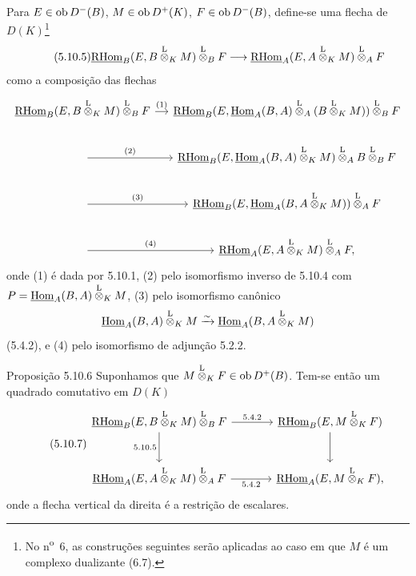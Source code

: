 Para $E\in\operatorname{ob} D^-(B)$, $M\in\operatorname{ob} D^+(K)$, $F\in\operatorname{ob} D^-(B)$, define-se uma flecha de $D(K)$\footnote{No n\textsuperscript{o}~6, as construções seguintes serão aplicadas ao caso em que $M$ é um complexo dualizante (6.7).}
\begin{equation}\tag{5.10.5}
\underline{\mathrm{RHom}}_B(E,B\overset{\mathrm L}{\otimes}_KM)\overset{\mathrm L}{\otimes}_BF\longrightarrow\underline{\mathrm{RHom}}_A(E,A\overset{\mathrm L}{\otimes}_KM)\overset{\mathrm L}{\otimes}_AF
\end{equation}
como a composição das flechas
\[
\begin{tikzcd}[column sep=small]
\uRHom_B(E,B\lten_KM)\lten_BF \arrow[r,"(1)"] & \uRHom_B(E,\uHom_A(B,A)\lten_A(B\lten_KM))\lten_BF \\
\arrow[r,"(2)"] & \uRHom_B(E,\uHom_A(B,A)\lten_KM)\lten_A B\lten_BF \\
\arrow[r,"(3)"] & \uRHom_B(E,\uHom_A(B,A\lten_KM))\lten_AF \\
\arrow[r,"(4)"] & \uRHom_A(E,A\lten_KM)\lten_AF,
\end{tikzcd}
\]
onde (1) é dada por 5.10.1, (2) pelo isomorfismo inverso de 5.10.4 com $P=\underline{\operatorname{Hom}}_A(B,A)\overset{\mathrm L}{\otimes}_KM$, (3) pelo isomorfismo canônico
\[
\underline{\operatorname{Hom}}_A(B,A)\overset{\mathrm L}{\otimes}_KM\xrightarrow{\sim}\underline{\operatorname{Hom}}_A(B,A\overset{\mathrm L}{\otimes}_KM)
\]
(5.4.2), e (4) pelo isomorfismo de adjunção 5.2.2.

\begin{statement}{Proposição 5.10.6}
Suponhamos que $M\overset{\mathrm L}{\otimes}_KF\in\operatorname{ob} D^+(B)$. Tem-se então um quadrado comutativo em $D(K)$
\begin{equation}\tag{5.10.7}
\begin{tikzcd}[column sep=large,row sep=large]
\uRHom_B(E,B\lten_KM)\lten_BF \arrow[r,"5.4.2"] \arrow[d,"5.10.5"'] & \uRHom_B(E,M\lten_KF) \arrow[d]\\
\uRHom_A(E,A\lten_KM)\lten_AF \arrow[r,"5.4.2"'] & \uRHom_A(E,M\lten_KF),
\end{tikzcd}
\end{equation}
onde a flecha vertical da direita é a restrição de escalares.
\end{statement}
